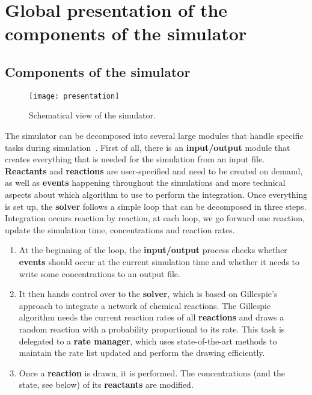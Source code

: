 \graphicspath{{\relativepath/figures/}}

\section{Global presentation of the components of the simulator}
\label{sec:global}

\subsection{Components of the simulator}

\begin{figure}[!ht]
        \centering
        \texttt{[image: presentation]}
	\caption{Schematical view of the simulator.}
\label{fig:presentation}
\end{figure}

The simulator can be decomposed into several large modules
that handle specific tasks during simulation~.
First of all, there is an \textbf{input/output} module that creates everything
that is needed for the simulation from an input file.
\textbf{Reactants} and \textbf{reactions} are user-specified and need to be created on demand,
as well as \textbf{events} happening throughout the simulations
and more technical aspects about which algorithm to use to perform the integration.
Once everything is set up, the \textbf{solver} follows a simple loop
that can be decomposed in three steps.
Integration occurs reaction by reaction, at each loop, we go forward one reaction,
update the simulation time, concentrations and reaction rates.

\begin{enumerate}
	\item At the beginning of the loop,
  the \textbf{input/output} process checks whether \textbf{events}
  should occur at the current simulation time and
  whether it needs to write some concentrations to an output file.
	\item It then hands control over to the \textbf{solver},
  which is based on Gillespie's approach to integrate a network of chemical reactions.
  The Gillespie algorithm needs the current reaction rates of all \textbf{reactions}
  and draws a random reaction with a probability proportional to its rate.
  This task is delegated to a \textbf{rate manager},
  which uses state-of-the-art methods to maintain the rate list updated and perform the drawing efficiently.
	\item Once a \textbf{reaction} is drawn, it is performed.
  The concentrations (and the state, see below) of its \textbf{reactants} are modified.
\end{enumerate}








